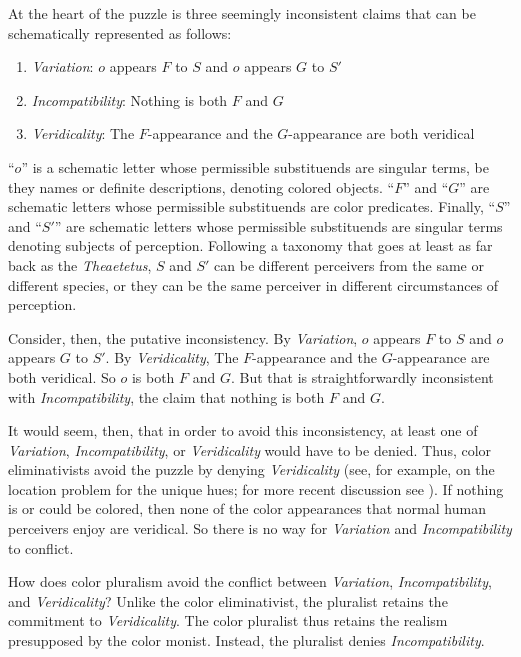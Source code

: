 \documentclass[12pt]{article}
\begin{document}
At the heart of the puzzle is three seemingly inconsistent claims that can be schematically represented as follows:
\begin{enumerate}
	\item \emph{Variation}: \( o \) appears \( F \) to \( S \) and \( o \) appears \( G \) to \( S' \)
	\item \emph{Incompatibility}: Nothing is both \( F \) and \( G \)
	\item \emph{Veridicality}: The \( F \)-appearance and the \( G \)-appearance are both veridical
\end{enumerate}
``\( o \)'' is a schematic letter whose permissible substituends are singular terms, be they names or definite descriptions, denoting colored objects. ``\( F \)'' and ``\( G \)'' are schematic letters whose permissible substituends are color predicates. Finally, ``\( S \)'' and ``\( S' \)'' are schematic letters whose permissible substituends are singular terms denoting subjects of perception. Following a taxonomy that goes at least as far back as the \emph{Theaetetus}, \( S \) and \( S' \) can be different perceivers from the same or different species, or they can be the same perceiver in different circumstances of perception.

Consider, then, the putative inconsistency. By \emph{Variation}, \( o \) appears \( F \) to \( S \) and \( o \) appears \( G \) to \( S' \). By \emph{Veridicality}, The \( F \)-appearance and the \( G \)-appearance are both veridical. So \( o \) is both \( F \) and \( G \). But that is straightforwardly inconsistent with \emph{Incompatibility}, the claim that nothing is both \( F \) and \( G \). 

It would seem, then, that in order to avoid this inconsistency, at least one of \emph{Variation}, \emph{Incompatibility}, or \emph{Veridicality} would have to be denied. Thus, color eliminativists avoid the puzzle by denying \emph{Veridicality} (see, for example, \citealt{Hardin:1993kn} on the location problem for the unique hues; for more recent discussion see \citealt{Gatzia:2010ga}). If nothing is or could be colored, then none of the color appearances that normal human perceivers enjoy are veridical. So there is no way for \emph{Variation} and \emph{Incompatibility} to conflict.

How does color pluralism avoid the conflict between \emph{Variation}, \emph{Incompatibility}, and \emph{Veridicality}? Unlike the color eliminativist, the pluralist retains the commitment to \emph{Veridicality}. The color pluralist thus retains the realism presupposed by the color monist. Instead, the pluralist denies \emph{Incompatibility}.
\end{document}
